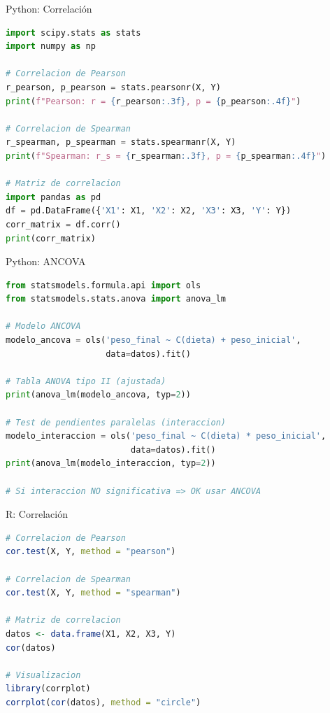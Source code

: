 \documentclass[aspectratio=169]{beamer}
\begin{document}
\begin{frame}[fragile]{Python: Correlación}
\begin{lstlisting}[language=Python]
import scipy.stats as stats
import numpy as np

# Correlacion de Pearson
r_pearson, p_pearson = stats.pearsonr(X, Y)
print(f"Pearson: r = {r_pearson:.3f}, p = {p_pearson:.4f}")

# Correlacion de Spearman
r_spearman, p_spearman = stats.spearmanr(X, Y)
print(f"Spearman: r_s = {r_spearman:.3f}, p = {p_spearman:.4f}")

# Matriz de correlacion
import pandas as pd
df = pd.DataFrame({'X1': X1, 'X2': X2, 'X3': X3, 'Y': Y})
corr_matrix = df.corr()
print(corr_matrix)
\end{lstlisting}
\end{frame}

\begin{frame}[fragile]{Python: ANCOVA}
\begin{lstlisting}[language=Python]
from statsmodels.formula.api import ols
from statsmodels.stats.anova import anova_lm

# Modelo ANCOVA
modelo_ancova = ols('peso_final ~ C(dieta) + peso_inicial',
                    data=datos).fit()

# Tabla ANOVA tipo II (ajustada)
print(anova_lm(modelo_ancova, typ=2))

# Test de pendientes paralelas (interaccion)
modelo_interaccion = ols('peso_final ~ C(dieta) * peso_inicial',
                         data=datos).fit()
print(anova_lm(modelo_interaccion, typ=2))

# Si interaccion NO significativa => OK usar ANCOVA
\end{lstlisting}
\end{frame}

\begin{frame}[fragile]{R: Correlación}
\begin{lstlisting}[language=R]
# Correlacion de Pearson
cor.test(X, Y, method = "pearson")

# Correlacion de Spearman
cor.test(X, Y, method = "spearman")

# Matriz de correlacion
datos <- data.frame(X1, X2, X3, Y)
cor(datos)

# Visualizacion
library(corrplot)
corrplot(cor(datos), method = "circle")
\end{lstlisting}
\end{frame}
\end{document}
